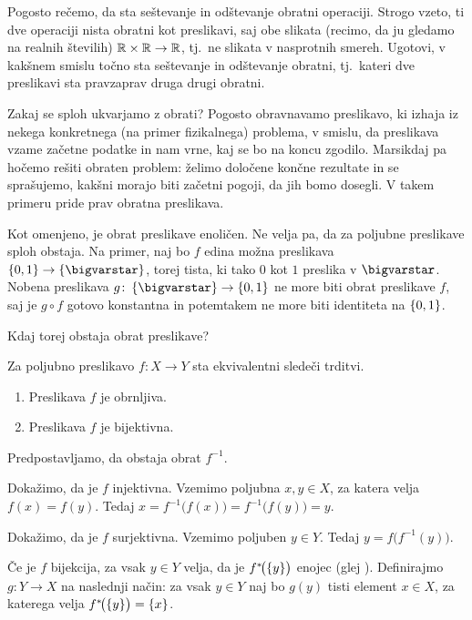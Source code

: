 \begin{vaja}
Pogosto rečemo, da sta seštevanje in odštevanje obratni operaciji. Strogo vzeto, ti dve operaciji nista obratni kot preslikavi, saj obe slikata (recimo, da ju gledamo na realnih številih) $\mathbb{R} \times \mathbb{R} \to \mathbb{R}$, tj.~ne slikata v nasprotnih smereh. Ugotovi, v kakšnem smislu točno sta seštevanje in odštevanje obratni, tj.~kateri dve preslikavi sta pravzaprav druga drugi obratni.
\end{vaja}

Zakaj se sploh ukvarjamo z obrati? Pogosto obravnavamo preslikavo, ki izhaja iz nekega konkretnega (na primer fizikalnega) problema, v smislu, da preslikava vzame začetne podatke in nam vrne, kaj se bo na koncu zgodilo. Marsikdaj pa hočemo rešiti obraten problem: želimo določene končne rezultate in se sprašujemo, kakšni morajo biti začetni pogoji, da jih bomo dosegli. V takem primeru pride prav obratna preslikava.

Kot omenjeno, je obrat preslikave enoličen. Ne velja pa, da za poljubne preslikave sploh obstaja. Na primer, naj bo $f$ edina možna preslikava $\set{0, 1} \to \set{\unit}$, torej tista, ki tako $0$ kot $1$ preslika v $\unit$. Nobena preslikava $g\colon \set{\unit} \to \set{0, 1}$ ne more biti obrat preslikave $f$, saj je $g \circ f$ gotovo konstantna in potemtakem ne more biti identiteta na $\set{0, 1}$.

Kdaj torej obstaja obrat preslikave?

\begin{trditev}
Za poljubno preslikavo $f\colon X \to Y$ sta ekvivalentni sledeči trditvi.
\begin{enumerate}
\item
Preslikava $f$ je obrnljiva.
\item
Preslikava $f$ je bijektivna.
\end{enumerate}
\end{trditev}

\begin{dokaz}
\begin{implproof}{1}{2}
Predpostavljamo, da obstaja obrat $f^{-1}$.

Dokažimo, da je $f$ injektivna. Vzemimo poljubna $x, y \in X$, za katera velja $f(x) = f(y)$. Tedaj $x = f^{-1}\big(f(x)\big) = f^{-1}\big(f(y)\big) = y$.

Dokažimo, da je $f$ surjektivna. Vzemimo poljuben $y \in Y$. Tedaj $y = f\big(f^{-1}(y)\big)$.
\end{implproof}
\begin{implproof}{2}{1}
Če je $f$ bijekcija, za vsak $y \in Y$ velja, da je $\pim[1]{f}{\set{y}}$ enojec (glej ). Definirajmo $g\colon Y \to X$ na naslednji način: za vsak $y \in Y$ naj bo $g(y)$ tisti element $x \in X$, za katerega velja $\pim[1]{f}{\set{y}} = \set{x}$. 
\end{implproof}
\end{dokaz}

